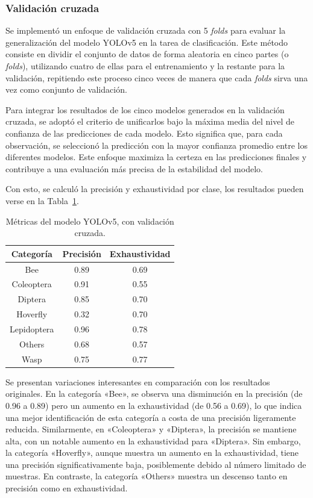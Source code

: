 \subsubsection{Validación cruzada}

Se implementó un enfoque de validación cruzada con 5 \textit{folds} para evaluar la generalización del modelo YOLOv5 en la tarea de clasificación. Este método consiste en dividir el conjunto de datos de forma aleatoria en cinco partes (o \textit{folds}), utilizando cuatro de ellas para el entrenamiento y la restante para la validación, repitiendo este proceso cinco veces de manera que cada \textit{folds} sirva una vez como conjunto de validación. 

Para integrar los resultados de los cinco modelos generados en la validación cruzada, se adoptó el criterio de unificarlos bajo la máxima media del nivel de confianza de las predicciones de cada modelo. Esto significa que, para cada observación, se seleccionó la predicción con la mayor confianza promedio entre los diferentes modelos. Este enfoque maximiza la certeza en las predicciones finales y contribuye a una evaluación más precisa de la estabilidad del modelo.

Con esto, se calculó la precisión y exhaustividad por clase, los resultados pueden verse en la Tabla~\ref{tab:metricas_cross}.

\begin{table}[H]
    \centering\small
    \begin{tabular}{ccc}
    \toprule
          \textbf{Categoría} & \textbf{Precisión}  &  \textbf{Exhaustividad}\\ 
    \midrule
        Bee &           0.89 &  0.69 \\
        Coleoptera &    0.91 &  0.55 \\
        Diptera &       0.85 &  0.70 \\
        Hoverfly &      0.32 &  0.70 \\
        Lepidoptera &   0.96 &  0.78 \\
        Others &        0.68 &  0.57 \\
        Wasp &          0.75 &  0.77 \\
    \bottomrule
    \end{tabular}
    \caption{Métricas del modelo YOLOv5, con validación cruzada.}
    \label{tab:metricas_cross}
\end{table}

Se presentan variaciones interesantes en comparación con los resultados originales. En la categoría «Bee», se observa una disminución en la precisión (de 0.96 a 0.89) pero un aumento en la exhaustividad (de 0.56 a 0.69), lo que indica una mejor identificación de esta categoría a costa de una precisión ligeramente reducida. Similarmente, en «Coleoptera» y «Diptera», la precisión se mantiene alta, con un notable aumento en la exhaustividad para «Diptera». Sin embargo, la categoría «Hoverfly», aunque muestra un aumento en la exhaustividad, tiene una precisión significativamente baja, posiblemente debido al número limitado de muestras. En contraste, la categoría «Others» muestra un descenso tanto en precisión como en exhaustividad.

